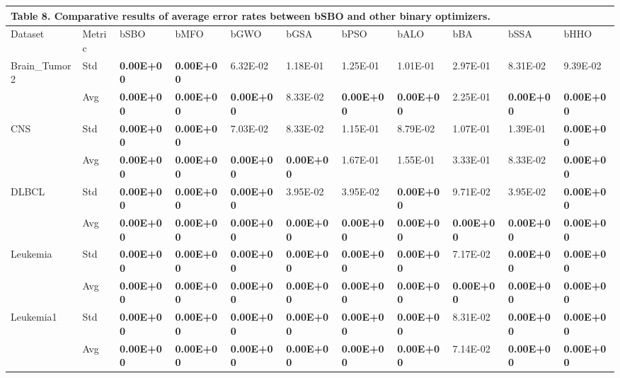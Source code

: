 \documentclass{article} %
\begin{document}
\begin{tabular}{|p{0.4in}|p{0.4in}|p{0.4in}|p{0.4in}|p{0.4in}|p{0.4in}|p{0.4in}|p{0.4in}|p{0.4in}|p{0.4in}|p{0.4in}|} \hline 
\multicolumn{11}{|p{1in}|}{\textbf{Table }8\textbf{.} Comparative results of average error rates between bSBO and other binary optimizers.\textbf{}} \\ \hline 
Dataset & Metric & bSBO & bMFO & bGWO & bGSA & bPSO & bALO & bBA & bSSA & bHHO \\ \hline 
Brain\_Tumor2 & Std & \textbf{0.00E+00} & \textbf{0.00E+00} & 6.32E-02 & 1.18E-01 & 1.25E-01 & 1.01E-01 & 2.97E-01 & 8.31E-02 & 9.39E-02 \\ \hline 
 & Avg & \textbf{0.00E+00} & \textbf{0.00E+00} & \textbf{0.00E+00} & 8.33E-02 & \textbf{0.00E+00} & \textbf{0.00E+00} & 2.25E-01 & \textbf{0.00E+00} & \textbf{0.00E+00} \\ \hline 
CNS & Std & \textbf{0.00E+00} & \textbf{0.00E+00} & 7.03E-02 & 8.33E-02 & 1.15E-01 & 8.79E-02 & 1.07E-01 & 1.39E-01 & \textbf{0.00E+00} \\ \hline 
 & Avg & \textbf{0.00E+00} & \textbf{0.00E+00} & \textbf{0.00E+00} & \textbf{0.00E+00} & 1.67E-01 & 1.55E-01 & 3.33E-01 & 8.33E-02 & \textbf{0.00E+00} \\ \hline 
DLBCL & Std & \textbf{0.00E+00} & \textbf{0.00E+00} & \textbf{0.00E+00} & 3.95E-02 & 3.95E-02 & \textbf{0.00E+00} & 9.71E-02 & 3.95E-02 & \textbf{0.00E+00} \\ \hline 
 & Avg & \textbf{0.00E+00} & \textbf{0.00E+00} & \textbf{0.00E+00} & \textbf{0.00E+00} & \textbf{0.00E+00} & \textbf{0.00E+00} & \textbf{0.00E+00} & \textbf{0.00E+00} & \textbf{0.00E+00} \\ \hline 
Leukemia & Std & \textbf{0.00E+00} & \textbf{0.00E+00} & \textbf{0.00E+00} & \textbf{0.00E+00} & \textbf{0.00E+00} & \textbf{0.00E+00} & 7.17E-02 & \textbf{0.00E+00} & \textbf{0.00E+00} \\ \hline 
 & Avg & \textbf{0.00E+00} & \textbf{0.00E+00} & \textbf{0.00E+00} & \textbf{0.00E+00} & \textbf{0.00E+00} & \textbf{0.00E+00} & \textbf{0.00E+00} & \textbf{0.00E+00} & \textbf{0.00E+00} \\ \hline 
Leukemia1 & Std & \textbf{0.00E+00} & \textbf{0.00E+00} & \textbf{0.00E+00} & \textbf{0.00E+00} & \textbf{0.00E+00} & \textbf{0.00E+00} & 8.31E-02 & \textbf{0.00E+00} & \textbf{0.00E+00} \\ \hline 
 & Avg & \textbf{0.00E+00} & \textbf{0.00E+00} & \textbf{0.00E+00} & \textbf{0.00E+00} & \textbf{0.00E+00} & \textbf{0.00E+00} & 7.14E-02 & \textbf{0.00E+00} & \textbf{0.00E+00} \\ \hline 

\end{tabular}
\end{document}

